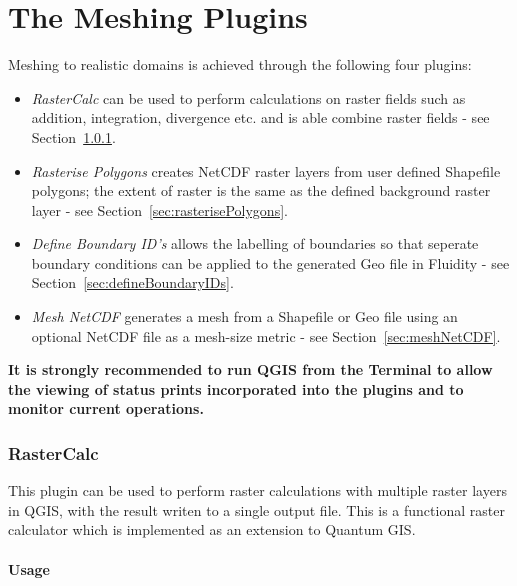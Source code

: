 \chapter{The Meshing Plugins}
Meshing to realistic domains is achieved through the following four plugins:
\begin{itemize}
\item \emph{RasterCalc} can be used to perform calculations on raster fields such as addition, integration, divergence etc. and is able combine raster fields - see Section~\ref{sec:rasterCalc}. 
\item \emph{Rasterise Polygons} creates NetCDF raster layers from user defined Shapefile polygons; the extent of raster is the same as the defined background raster layer - see Section~\ref{sec:rasterisePolygons}. 
\item \emph{Define Boundary ID's} allows the labelling of boundaries so that seperate boundary conditions can be applied to the generated Geo file in Fluidity - see Section~\ref{sec:defineBoundaryIDs}. 
\item \emph{Mesh NetCDF} generates a mesh from a Shapefile or Geo file using an optional NetCDF file as a mesh-size metric - see Section~\ref{sec:meshNetCDF}.
\end{itemize}

\textbf{It is strongly recommended to run QGIS from the Terminal to allow the viewing of status prints incorporated into the plugins and to monitor current operations.}

\subsection{RasterCalc}
\label{sec:rasterCalc}
\begin{spacing}{0}
	\small
\end{spacing}
\normalsize
\vspace{3mm}
This plugin can be used to perform raster calculations with multiple raster layers in QGIS, with the result writen to a single output file. This is a functional raster calculator which is implemented as an extension to Quantum GIS.
\subsubsection{Usage}

